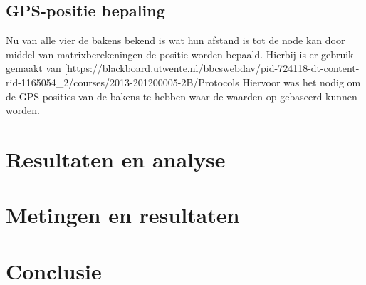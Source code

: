 \documentclass{article}
\begin{document}
\subsection{GPS-positie bepaling}
Nu van alle vier de bakens bekend is wat hun afstand is tot de node kan door middel van matrixberekeningen de positie worden bepaald. Hierbij is er gebruik gemaakt van [https://blackboard.utwente.nl/bbcswebdav/pid-724118-dt-content-rid-1165054_2/courses/2013-201200005-2B/Protocols%
Hiervoor was het nodig om de GPS-posities van de bakens te hebben waar de waarden op gebaseerd kunnen worden. 

\section{Resultaten en analyse}

  
\section{Metingen en resultaten}

\section{Conclusie}

\newpage
\end{document}
